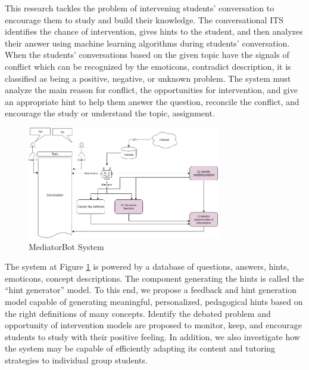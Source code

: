 \documentclass[letterpaper%
, twoside%
, 12pt%
,these%
, english%
,creativecommons,hyperref, withAlgo2e %
]{thETS}
\begin{document}
This research tackles the problem of intervening students' conversation to encourage them to study and build their knowledge. The conversational ITS identifies the chance of intervention, gives hints to the student, and then analyzes their answer using machine learning algorithms during students' conversation. When the students' conversations based on the given topic have the signals of conflict which can be recognized by the emoticons, contradict description, it is classified as being a positive, negative, or unknown problem. The system must analyze the main reason for conflict, the opportunities for intervention,  and give an appropriate hint to help them answer the question, reconcile the conflict, and encourage the study or understand the topic, assignment. 
\begin{figure}
	\centering
	
	\includegraphics[width=0.75\textwidth]{Figures/2.png}
	
	\caption{MediatorBot System }
	\label{fig:autotutor}
\end{figure}
The system at Figure \ref{fig:autotutor} is powered by a database of questions, answers, hints, emoticons, concept descriptions. The component generating the hints is called the “hint generator” model. To this end, we propose a feedback and hint generation model capable of generating meaningful, personalized, pedagogical hints based on the right definitions of many concepts. Identify the debated problem and opportunity of intervention models are proposed to monitor, keep, and encourage students to study with their positive feeling.  In addition, we also investigate how the system may be capable of efficiently adapting its content and tutoring strategies to individual group students.
\end{document}
